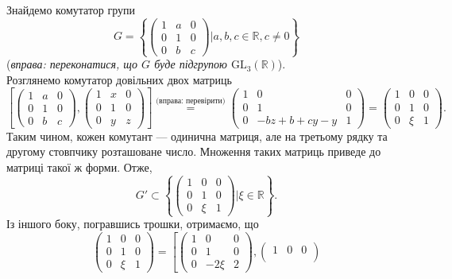 \documentclass{math_library}
\begin{document}
\begin{example}
Знайдемо комутатор групи 
\[
G = \left\{ \begin{pmatrix}
1 & a & 0 \\
0 & 1 & 0 \\
0 & b & c
\end{pmatrix} \Big| a,b,c \in \mathbb{R}, c \neq 0 \right\}
\] 
(\textit{вправа: переконатися, що $G$ буде підгрупою $\mathrm{GL}_3(\mathbb{R})$}).\\
Розглянемо комутатор довільних двох матриць
\[
\left[ \begin{pmatrix}
1 & a & 0 \\
0 & 1 & 0 \\
0 & b & c
\end{pmatrix},
\begin{pmatrix}
1 & x & 0 \\
0 & 1 & 0 \\
0 & y & z
\end{pmatrix}
\right] \overset{\textit{(вправа: перевірити)}}{=} \begin{pmatrix}
1 & 0 & 0 \\
0 & 1 & 0 \\
0 & -bz+b+cy-y & 1
\end{pmatrix} = \begin{pmatrix}
1 & 0 & 0 \\
0 & 1 & 0 \\
0 & \xi & 1
\end{pmatrix}.
\]
Таким чином, кожен комутант --- одинична матриця, але на третьому рядку та другому стовпчику розташоване число. Множення таких матриць приведе до матриці такої ж форми. Отже, 
\[
G' \subset \left\{ \begin{pmatrix}
1 & 0 & 0 \\
0 & 1 & 0 \\
0 & \xi & 1
\end{pmatrix} \Big| \xi \in \mathbb{R} \right\}.
\]
Із іншого боку, погравшись трошки, отримаємо, що
\[
\begin{pmatrix}
1 & 0 & 0 \\
0 & 1 & 0 \\
0 & \xi & 1
\end{pmatrix} = \left[ \begin{pmatrix}
1 & 0 & 0 \\
0 & 1 & 0 \\
0 & -2\xi & 2
\end{pmatrix}, \begin{pmatrix}
1 & 0 & 0 \\

\end{pmatrix}\]
\end{example}
\end{document}
